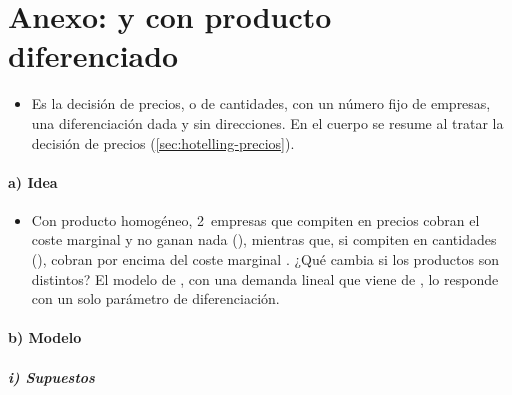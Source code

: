 \documentclass[11pt]{article}
\begin{document}
\section{Anexo:  y  con producto diferenciado}\label{anexo:bertrand-cournot}

\begin{itemize}
\item Es la decisión de precios, o de cantidades, con un número fijo de empresas, una diferenciación dada y sin direcciones. En el cuerpo se resume al tratar la decisión de precios (\ref{sec:hotelling-precios}).
\end{itemize}

\paragraph{a) Idea}

\begin{itemize}
\item Con producto homogéneo, 2~empresas que compiten en precios cobran el coste marginal y no ganan nada (), mientras que, si compiten en cantidades (), cobran por encima del coste marginal . ¿Qué cambia si los productos son distintos? El modelo de \textcite{SinghVives1984Price}, con una demanda lineal que viene de \textcite{Bowley1924Mathematical}, lo responde con un solo parámetro de diferenciación.
\end{itemize}

\paragraph{b) Modelo}

\subparagraph{i) Supuestos}
\end{document}
